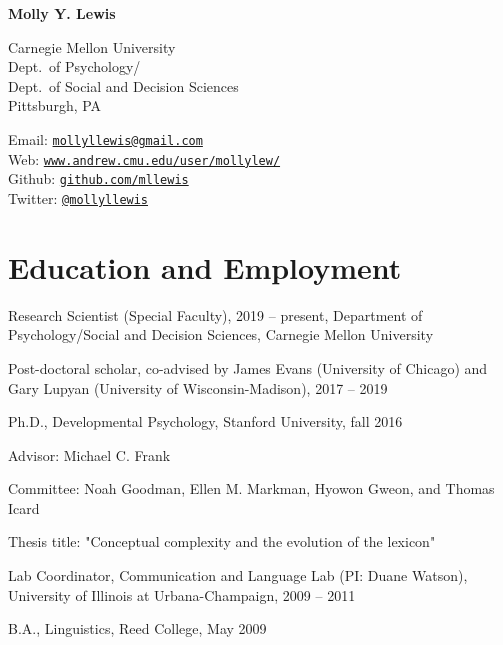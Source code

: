 \documentclass[letterpaper]{article}
\def\name{Molly Y.  Lewis}
\renewenvironment{itemize}{
  \begin{list}{}{
    \setlength{\leftmargin}{1.5em}
  }
}{
  \end{list}
}
\begin{document}
\centerline{\huge \bf \name}
\vspace{0.25in}


 \normalsize
  \begin{multicols}{2}
\begin{flushleft}
  Carnegie Mellon University  \\
  Dept.\ of Psychology/ \\
  Dept.\ of Social and Decision Sciences\\
  Pittsburgh, PA
\end{flushleft}
\begin{flushleft}
Email: \href{mailto:mollyllewis@gmail.com}{\tt mollyllewis@gmail.com}\\
Web: \href{http://www.andrew.cmu.edu/user/mollylew/}{\tt www.andrew.cmu.edu/user/mollylew/}\\
Github: \href{https://github.com/mllewis}{\tt github.com/mllewis}\\
Twitter: \href{https://twitter.com/mollyllewis}{\tt @mollyllewis}\\

\end{flushleft}

\end{multicols}

\section*{Education and Employment}
\begin{itemize}

\item Research Scientist (Special Faculty), 2019 -- present, Department of Psychology/Social and Decision Sciences, Carnegie Mellon University

\item Post-doctoral scholar, co-advised by James Evans (University of Chicago) and Gary Lupyan (University of Wisconsin-Madison), 2017 -- 2019


  \item Ph.D., Developmental Psychology, Stanford University, fall 2016
  \begin{itemize}
  	\item Advisor: Michael C. Frank
  		\item Committee: Noah Goodman, Ellen M. Markman, Hyowon Gweon, and Thomas Icard
  	\item Thesis title: "Conceptual complexity and the evolution of the lexicon"

   \end{itemize}
   \item Lab Coordinator, Communication and Language Lab (PI: Duane Watson), University of Illinois at Urbana-Champaign,  2009 -- 2011
  \item  B.A., Linguistics, Reed College, May 2009
  \end{itemize}
\end{document}
